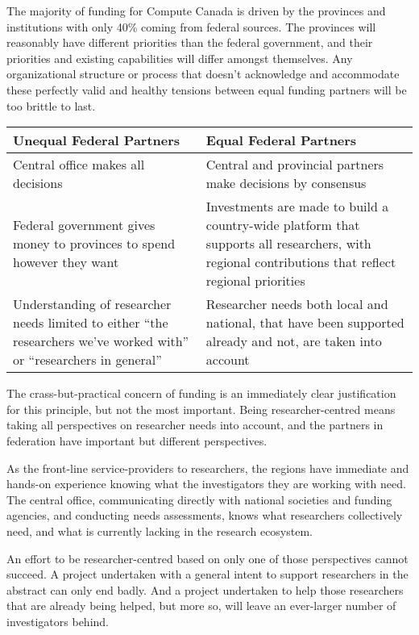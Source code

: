 \documentclass[11pt, letterpaper, twoside]{article}
\begin{document}
The majority of funding for Compute Canada is driven by the provinces
and institutions with only 40\% coming from federal sources.  The
provinces will reasonably have different priorities than the federal
government, and their priorities and existing capabilities will differ
amongst themselves. Any organizational structure or process that doesn't
acknowledge and accommodate these perfectly valid and healthy tensions
between equal funding partners will be too brittle to last.

\begin{table}[ht]
\centering
\small {\sffamily
{}
\begin{tabular}{P{2.5in}|P{2.5in}}
\textcolor{cdaRed}{\textbf{Unequal Federal Partners}} & \textcolor{cdaRed}{\textbf{Equal Federal Partners}} \\
\hline \hline
Central office makes all decisions & Central and provincial partners make decisions by consensus\\
Federal government gives money to provinces to spend however they want & Investments are made to build a country-wide platform that supports all researchers, with regional contributions that reflect regional priorities \\
Understanding of researcher needs limited to either \enquote{the researchers we've worked with} or \enquote{researchers in general} & Researcher needs both local and national, that have been supported already and not, are taken into account \\
\hline
\end{tabular}
}
\end{table}

The crass-but-practical concern of funding is an immediately clear
justification for this principle, but not the most important. Being
researcher-centred means taking all perspectives on researcher needs
into account, and the partners in federation have important but
different perspectives.

As the front-line service-providers to researchers, the regions have
immediate and hands-on experience knowing what the investigators they
are working with need. The central office, communicating directly with
national societies and funding agencies, and conducting needs
assessments, knows what researchers collectively need, and what is
currently lacking in the research ecosystem.

An effort to be researcher-centred based on only one of those
perspectives cannot succeed. A project undertaken with a general intent
to support researchers in the abstract can only end badly. And a project
undertaken to help those researchers that are already being helped, but
more so, will leave an ever-larger number of investigators behind.
\end{document}
